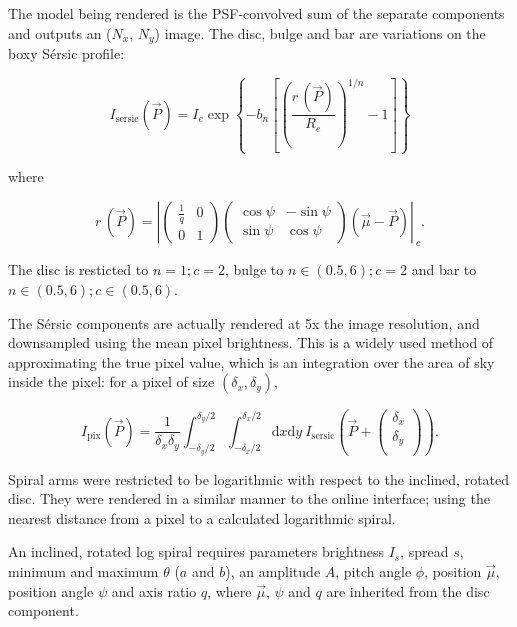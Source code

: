 \documentclass[trackchanges]{aastex63}
\begin{document}
The model being rendered is the PSF-convolved sum of the separate components and outputs an ($N_x$, $N_y$) image. The disc, bulge and bar are variations on the boxy S\'ersic profile:

\begin{equation}
I_\mathrm{sersic}(\vec{P}) = I_e \exp\left\{-b_n\left[\left(\frac{r\,(\vec{P})}{R_e}\right)^{1/n} - 1\right]\right\}
\end{equation}

where

\begin{equation}
r\,(\vec{P}) = \left|\begin{pmatrix}
\frac{1}{q} & 0 \\
0 & 1
\end{pmatrix}\begin{pmatrix}
\cos\psi & -\sin\psi\\
\sin\psi & \cos\psi
\end{pmatrix}\left(\vec\mu - \vec{P}\right)\right|_{\ c}.
\end{equation}

The disc is resticted to $n=1; c=2$, bulge to $n\in(0.5, 6); c=2$ and bar to $n\in(0.5, 6); c\in(0.5, 6)$.

The S\'ersic components are actually rendered at 5x the image resolution, and downsampled using the mean pixel brightness. This is a widely used method of approximating the true pixel value, which is an integration over the area of sky inside the pixel: for a pixel of size $(\delta_x, \delta_y)$,

\begin{equation}
I_\mathrm{pix}(\vec{P}) = \frac{1}{\delta_x \delta_y}\int_{-\delta_y/2}^{\delta_y/2}\int_{-\delta_x/2}^{\delta_x/2}\mathrm{d}x\mathrm{d}y\ I_\mathrm{sersic}\left(\vec{P} + \begin{pmatrix}
\delta_x \\
\delta_y \\
\end{pmatrix}\right).
\end{equation}

Spiral arms were restricted to be logarithmic with respect to the inclined, rotated disc. They were rendered in a similar manner to the online interface; using the nearest distance from a pixel to a calculated logarithmic spiral.

An inclined, rotated log spiral requires parameters brightness $I_s$, spread $s$, minimum and maximum $\theta$ ($a$ and $b$), an amplitude $A$, pitch angle $\phi$, position $\vec\mu$, position angle $\psi$ and axis ratio $q$, where $\vec\mu$, $\psi$ and $q$ are inherited from the disc component.
\end{document}
